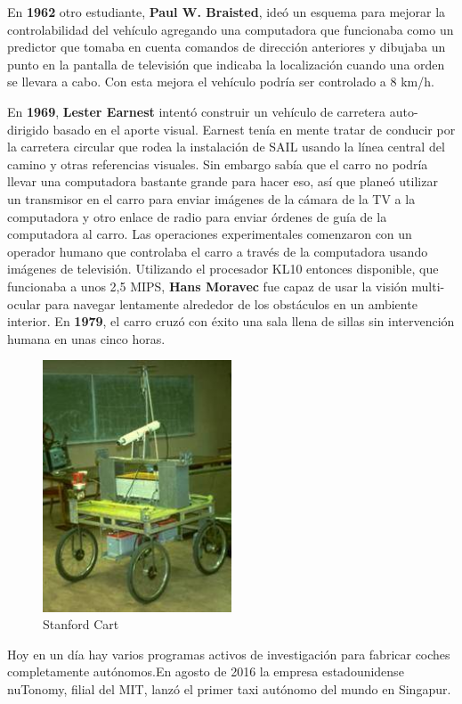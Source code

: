 \documentclass[a4paper, 11pt]{article} %
\begin{document}
En \textbf{1962} otro estudiante, \textbf{Paul W. Braisted}, ideó un esquema para mejorar la controlabilidad del vehículo agregando una computadora que funcionaba como un predictor que tomaba en cuenta comandos de dirección anteriores y dibujaba un punto en la pantalla de televisión que indicaba la localización cuando una orden se llevara a cabo. Con esta mejora el vehículo podría ser controlado a 8 km/h. 

En \textbf{1969}, \textbf{Lester Earnest} intentó construir un vehículo de carretera auto-dirigido basado en el aporte visual. Earnest tenía en mente tratar de conducir por la carretera circular que rodea la instalación de SAIL usando la línea central del camino y otras referencias visuales. Sin embargo sabía que el carro no podría llevar una computadora bastante grande para hacer eso, así que planeó utilizar un transmisor en el carro para enviar imágenes de la cámara de la TV a la computadora y otro enlace de radio para enviar órdenes de guía de la computadora al carro. Las operaciones experimentales comenzaron con un operador humano que controlaba el carro a través de la computadora usando imágenes de televisión. Utilizando el procesador KL10 entonces disponible, que funcionaba a unos 2,5 MIPS, \textbf{Hans Moravec} fue capaz de usar la visión multi-ocular para navegar lentamente alrededor de los obstáculos en un ambiente interior.
En \textbf{1979}, el carro cruzó con éxito una sala llena de sillas sin intervención humana en unas cinco horas.
\begin{figure}[H]
	\centering
	\includegraphics[width=0.5\textwidth]{stanford_cart.jpg}
	\caption{Stanford Cart}
	\label{Stanford Cart}
\end{figure}
Hoy en un día hay varios programas activos de investigación para fabricar coches completamente autónomos.En agosto de 2016 la empresa estadounidense nuTonomy, filial del MIT, lanzó el primer taxi autónomo del mundo en Singapur.
\end{document}
